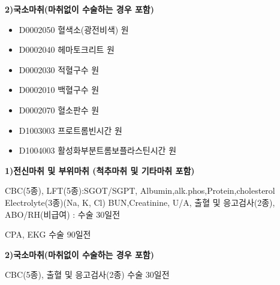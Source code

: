 {\textbf{2)국소마취(마취없이 수술하는 경우 포함)} \par
\begin{itemize}\tightlist
\item[\dschemical] D0002050 혈색소(광전비색)  원
\item[\dschemical] D0002040 헤마토크리트  원
\item[\dschemical] D0002030 적혈구수  원
\item[\dschemical] D0002010 백혈구수  원
\item[\dschemical] D0002070 혈소판수  원
\item[\dschemical] D1003003 프로트롬빈시간  원
\item[\dschemical] D1004003 활성화부분트롬보플라스틴시간  원
\end{itemize}
}
{
\Large \textbf{1)전신마취 및 부위마취 (척추마취 및 기타마취 포함)}\normalsize \par
CBC(5종), LFT(5종):SGOT/SGPT, Albumin,alk.phos,Protein,cholesterol
Electrolyte(3종)(Na, K, Cl)
BUN,Creatinine, U/A, 출혈 및 응고검사(2종), ABO/RH(비급여) : 수술 30일전 \par
CPA, EKG 수술 90일전 \par
\Large \textbf{2)국소마취(마취없이 수술하는 경우 포함)}\normalsize \par
CBC(5종), 출혈 및 응고검사(2종) 수술 30일전
}